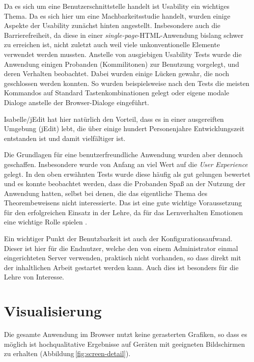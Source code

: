Da es sich um eine Benutzerschnittstelle handelt ist Usability ein wichtiges Thema. Da es sich hier
um eine Machbarkeitsstudie handelt, wurden einige Aspekte der Usability zunächst hinten angestellt.
Insbesondere auch die Barrierefreiheit, da diese in einer \textit{single-page}-HTML-Anwendung
bislang schwer zu erreichen ist, nicht zuletzt auch weil viele unkonventionelle Elemente verwendet
werden mussten. Anstelle von ausgiebigen Usability Tests wurde die Anwendung einigen Probanden
(Kommilitonen) zur Benutzung vorgelegt, und deren Verhalten beobachtet. Dabei wurden einige Lücken
gewahr, die noch geschlossen werden konnten. So wurden beispielsweise nach den Tests die meisten
Kommandos auf Standard Tastenkombinationen gelegt oder eigene modale Dialoge anstelle der 
Browser-Dialoge eingeführt.

Isabelle/jEdit hat hier natürlich den Vorteil, dass es in einer ausgereiften Umgebung (jEdit) lebt,
die über einige hundert Personenjahre Entwicklungszeit entstanden ist und damit vielfältiger ist.

Die Grundlagen für eine benutzerfreundliche Anwendung wurden aber dennoch geschaffen. Insbesondere
wurde von Anfang an viel Wert auf die \textit{User Experience} gelegt. In den oben erwähnten Tests
wurde diese häufig als gut gelungen bewertet und es konnte beobachtet werden, dass die Probanden
Spaß an der Nutzung der Anwendung hatten, selbst bei denen, die das eigentliche Thema des
Theorembeweisens nicht interessierte. Das ist eine gute wichtige Voraussetzung für den erfolgreichen
Einsatz in der Lehre, da für das Lernverhalten Emotionen eine wichtige Rolle spielen
\cite{emotionaldesign}.

Ein wichtiger Punkt der Benutzbarkeit ist auch der Konfigurationsaufwand. Dieser ist hier für die
Endnutzer, welche den von einem Administrator einmal eingerichteten Server verwenden, praktisch nicht
vorhanden, so dass direkt mit der inhaltlichen Arbeit gestartet werden kann. Auch dies ist besonders
für die Lehre von Interesse.

\section{Visualisierung}

Die gesamte Anwendung im Browser nutzt keine gerasterten Grafiken, so dass es möglich ist
hochqualitative Ergebnisse auf Geräten mit geeigneten Bildschirmen zu erhalten 
(Abbildung\,\ref{fig:screen-detail}).

